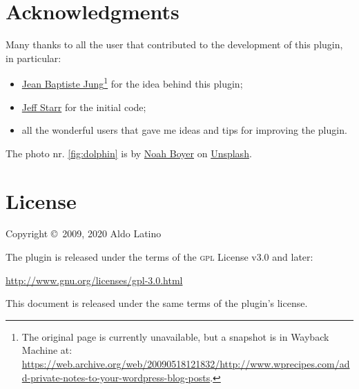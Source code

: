 	\section*{Acknowledgments}

	Many thanks to all the user that contributed to the development of this
	plugin, in particular:

	\begin{itemize}
		\item
		\href{http://www.wprecipes.com/add-private-notes-to-your-wordpress-blog-posts}{Jean
		Baptiste Jung}\footnote{The original page is currently unavailable, but a
		snapshot is in Wayback Machine at:
		\url{https://web.archive.org/web/20090518121832/http://www.wprecipes.com/add-private-notes-to-your-wordpress-blog-posts}.}
		for the idea behind this plugin;
		\item \href{http://digwp.com/2010/05/private-content-posts-shortcode}{Jeff Starr}
		for the initial code;
		\item all the wonderful users that gave me ideas and tips for improving
		the plugin.
	\end{itemize}

	The photo nr. \ref{fig:dolphin} is by \href{https://unsplash.com/@emerald_}{Noah
	Boyer} on \href{https://unsplash.com}{Unsplash}.

	\section*{License}

	Copyright \copyright~2009, 2020  Aldo Latino

	\noindent The plugin is released under the terms of the \textsc{gpl} License
	v3.0 and later:

	\begin{center}
		\url{http://www.gnu.org/licenses/gpl-3.0.html}
	\end{center}

	\noindent This document is released under the same terms of the plugin's
	license.
\endgroup
